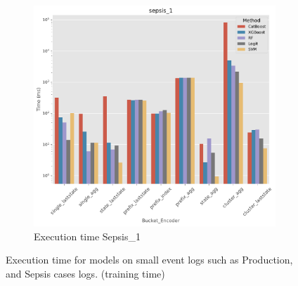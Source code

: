 \begin{figure}[!htbp]
\begin{subfigure}{0.48\textwidth}
		\includegraphics[width=\linewidth]{images/catboost/time/catboost/offline/sepsis_1.pdf}
		
		\caption{Execution time Sepsis\_1} \label{fig:t4}
	\end{subfigure}\hspace*{\fill}
\caption[Execution time comparison (offline)]{Execution time for models on small event logs such as Production, and  Sepsis cases logs. (training time)}
\label{fig:T2}
\end{figure}

